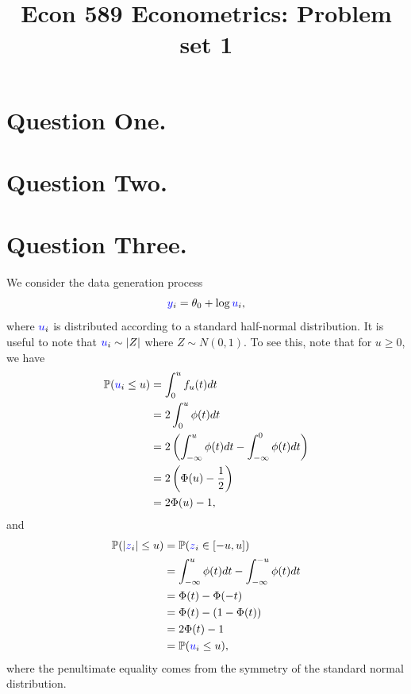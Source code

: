 \documentclass{article}
\title{Econ 589 Econometrics: Problem set 1}
\renewcommand{\r}[1]{\textcolor{blue}{#1}}
\renewcommand{\P}{\mathbb{P}}
\begin{document}
\newtheorem{claim}{Claim}
\newtheorem{thm}{Theorem}
\newtheorem{mydef}{Definition}
\maketitle

\section{Question One.}


\section{Question Two.}


\section{Question Three.}
We consider the data generation process
\begin{equation} \r{y}_{i}=\theta_{0}+\log\r{u}_{i},\end{equation}
where $\r{u}_{i}$ is distributed according to a standard half-normal distribution. It is useful to note that $\r{u}_{i}\sim|Z|$ where $Z\sim N(0,1)$. To see this, note that for $u\geq0$, we have
\begin{equation}\begin{split} \P(\r{u}_{i}\leq u)&=\int_{0}^{u}f_{u}(t)dt \\
&= 2\int_{0}^{u}\phi(t)dt \\
&= 2\left(\int_{-\infty}^{u}\phi(t)dt-\int_{-\infty}^{0}\phi(t)dt\right) \\
&= 2\left(\Phi(u)-\frac{1}{2}\right)\\
&=2\Phi(u)-1,
\end{split}\end{equation}
and
\begin{equation}\begin{split}
\P(|\r{z}_{i}|\leq u) &= \P(\r{z}_{i}\in[-u,u])\\
&= \int_{-\infty}^{u}\phi(t)dt - \int_{-\infty}^{-u}\phi(t)dt\\
&=\Phi(t)-\Phi(-t)\\
&=\Phi(t)-(1-\Phi(t))\\
&=2\Phi(t)-1\\
&=\P(\r{u}_{i}\leq u),\end{split}\end{equation}
where the penultimate equality comes from the symmetry of the standard normal distribution.
\end{document}
